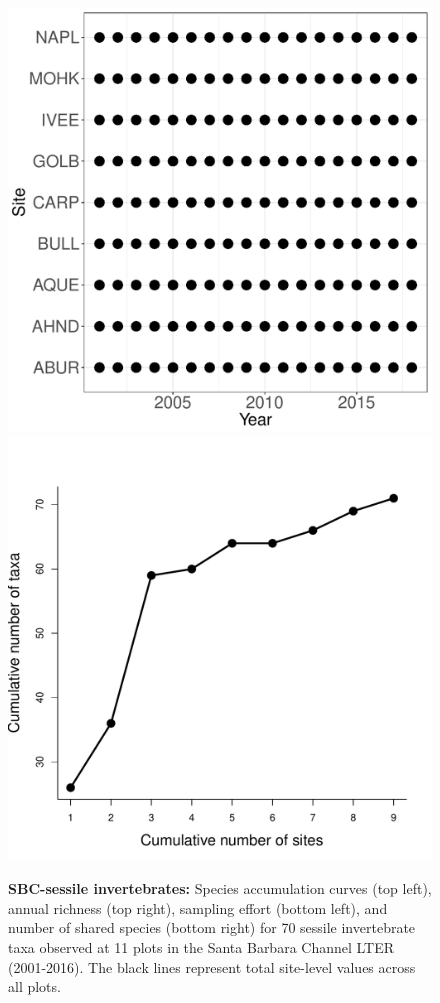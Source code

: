 \documentclass[11pt, oneside]{article}
\begin{document}
\begin{figure}[h!]
\includegraphics[scale = 0.4]{sbc-sessileInverts-castorani_spatiotemporal_sampling_effort.pdf}
\includegraphics[scale = 0.4]{sbc-sessileInverts-castorani_species_accumulation_space.pdf}
\caption{{\bf SBC-sessile invertebrates:} Species accumulation curves (top left),  annual richness (top right), sampling effort (bottom left), and number of shared species (bottom right)  for 70 sessile invertebrate taxa observed at 11 plots in the Santa Barbara Channel LTER (2001-2016). The black lines represent total site-level values across all plots.}
\label{sbc-sessileInverts}
\end{figure}
\end{document}
